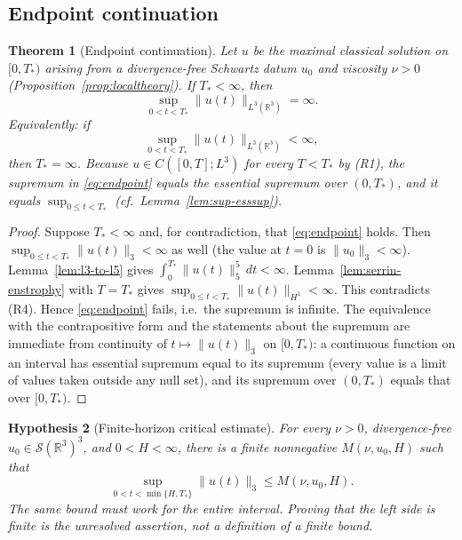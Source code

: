 \documentclass[11pt]{article}
\newtheorem{theorem}{Theorem}[section]
\newtheorem{hypothesis}[theorem]{Hypothesis}
\theoremstyle{definition}
\theoremstyle{plain}
\newcommand{\R}{\mathbb R}
\newcommand{\norm}[1]{\lVert #1\rVert}
\begin{document}
\subsection{Endpoint continuation}

\begin{theorem}[Endpoint continuation]\label{thm:continuation}
Let $u$ be the maximal classical solution on $[0,T_*)$ arising from a
divergence-free Schwartz datum $u_0$ and viscosity $\nu>0$
(Proposition~\ref{prop:localtheory}).  If $T_*<\infty$, then
\[
 \sup_{0<t<T_*}\norm{u(t)}_{L^3(\R^3)}=\infty .
\]
Equivalently: if
\begin{equation}\label{eq:endpoint}
 \sup_{0<t<T_*}\norm{u(t)}_{L^3(\R^3)}<\infty ,
\end{equation}
then $T_*=\infty$.  Because $u\in C([0,T];L^3)$ for every $T<T_*$ by (R1),
the supremum in \eqref{eq:endpoint} equals the essential supremum over
$(0,T_*)$, and it equals $\sup_{0\leq t<T_*}$
(cf.\ Lemma~\ref{lem:sup-esssup}).
\end{theorem}

\begin{proof}
Suppose $T_*<\infty$ and, for contradiction, that \eqref{eq:endpoint} holds.
Then $\sup_{0\leq t<T_*}\norm{u(t)}_3<\infty$ as well (the value at $t=0$ is
$\norm{u_0}_3<\infty$).  Lemma~\ref{lem:l3-to-l5} gives
$\int_0^{T_*}\norm{u(t)}_5^5\,dt<\infty$.  Lemma~\ref{lem:serrin-enstrophy}
with $T=T_*$ gives $\sup_{0\leq t<T_*}\norm{u(t)}_{H^1}<\infty$.  This
contradicts (R4).  Hence \eqref{eq:endpoint} fails, i.e.\ the supremum is
infinite.  The equivalence with the contrapositive form and the statements
about the supremum are immediate from continuity of $t\mapsto\norm{u(t)}_3$
on $[0,T_*)$: a continuous function on an interval has essential supremum
equal to its supremum (every value is a limit of values taken outside any
null set), and its supremum over $(0,T_*)$ equals that over $[0,T_*)$.
\end{proof}

\begin{hypothesis}[Finite-horizon critical estimate]\label{hyp:critical}
For every $\nu>0$, divergence-free $u_0\in\mathcal S(\R^3)^3$, and
$0<H<\infty$, there is a finite nonnegative $M(\nu,u_0,H)$ such that
\begin{equation}\label{eq:missing}
 \sup_{0<t<\min\{H,T_*\}}\norm{u(t)}_3\leq M(\nu,u_0,H).
\end{equation}
The same bound must work for the entire interval. Proving that the
left side is finite is the unresolved assertion, not a definition of a
finite bound.
\end{hypothesis}
\end{document}

